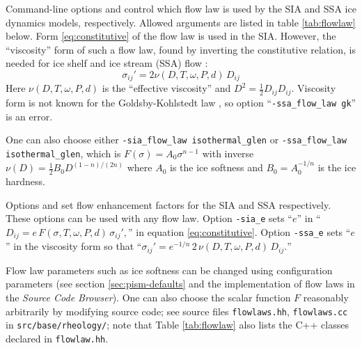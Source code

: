 Command-line options  and  control which flow law is used by the SIA and SSA ice dynamics models, respectively.  Allowed arguments are listed in table \ref{tab:flowlaw} below.  Form \eqref{eq:constitutive} of the flow law is used in the SIA.  However, the ``viscosity'' form of such a flow law, found by inverting the constitutive relation, is needed for ice shelf and ice stream (SSA) flow \cite{BBssasliding}:
	$$\sigma_{ij}' = 2 \nu(D,T,\omega,P,d)\,D_{ij} $$
Here $\nu(D,T,\omega,P,d)$ is the ``effective viscosity'' and $D^2 = \frac{1}{2} D_{ij} D_{ij}$.  Viscosity form is not known for the Goldsby-Kohlstedt law \cite{GoldsbyKohlstedt}, so option ``\texttt{-ssa_flow_law gk}'' is an error.

One can also choose either \texttt{-sia_flow_law isothermal_glen} or \texttt{-ssa_flow_law isothermal_glen}, which is $F(\sigma) = A_0 \sigma^{n-1}$ with inverse $\nu(D) = \frac{1}{2} B_0 D^{(1-n)/(2n)}$ where $A_0$ is the ice softness and $B_0=A_0^{-1/n}$ is the ice hardness.

Options  and  set flow enhancement factors for the SIA and SSA respectively. These options can be used with any flow law.  Option \texttt{-sia_e} sets ``$e$'' in ``$D_{ij} = e\, F(\sigma,T,\omega,P,d)\, \sigma_{ij}',$'' in equation \eqref{eq:constitutive}.  Option \texttt{-ssa_e} sets ``$e$'' in the viscosity form so that ``$\sigma_{ij}'  = e^{-1/n}\, 2\, \nu(D,T,\omega,P,d)\, D_{ij}.$''

Flow law parameters such as ice softness can be changed using configuration parameters (see section \ref{sec:pism-defaults} and the implementation of flow laws in the \emph{Source Code Browser}).  One can also choose the scalar function $F$ reasonably arbitrarily by modifying source code; see source files \texttt{flowlaws.hh}, \texttt{flowlaws.cc} in \texttt{src/base/rheology/}; note that Table \ref{tab:flowlaw} also lists the C++ classes declared in \texttt{flowlaw.hh}.

